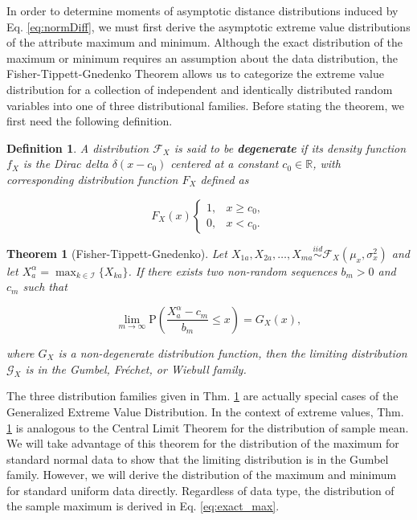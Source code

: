 \documentclass[10pt,letterpaper]{article}\usepackage[]{graphicx}\usepackage[]{color}
\newtheorem{theorem}{Theorem}[section]
\newtheorem{definition}{Definition}[section]
\begin{document}
In order to determine moments of asymptotic distance distributions induced by Eq. \ref{eq:normDiff}, we must first derive the asymptotic extreme value distributions of the attribute maximum and minimum. Although the exact distribution of the maximum or minimum requires an assumption about the data distribution, the Fisher-Tippett-Gnedenko Theorem allows us to categorize the extreme value distribution for a collection of independent and identically distributed random variables into one of three distributional families. Before stating the theorem, we first need the following definition.

\begin{definition}
A distribution $\mathcal{F}_X$ is said to be \textbf{degenerate} if its density function $f_X$ is the Dirac delta $\delta(x - c_0)$ centered at a constant $c_0 \in \mathbb{R}$, with corresponding distribution function $F_X$ defined as

\[F_X(x)\begin{cases}
          1, & x \geq c_0, \\
          0, & x < c_0.
        \end{cases}
\]
\end{definition}

\begin{theorem}[Fisher-Tippett-Gnedenko]\label{thm:EVT}
Let $X_{1a},X_{2a},\dots,X_{ma} \overset{iid}{\sim} \mathcal{F}_X\left(\mu_x,\sigma^2_x\right)$ and let $X^\alpha_a = \displaystyle \max_{k \in \mathcal{I}}\{X_{ka}\}$. If there exists two non-random sequences $b_m>0$ and $c_m$ such that

\[\lim_{m \to \infty} \text{P}\left(\frac{X^\alpha_a - c_m}{b_m} \leq x\right) = G_X(x),\]

\noindent where $G_X$ is a non-degenerate distribution function, then the limiting distribution $\mathcal{G}_X$ is in the Gumbel, Fr\'{e}chet, or Wiebull family.
\end{theorem}

The three distribution families given in Thm. \ref{thm:EVT} are actually special cases of the Generalized Extreme Value Distribution. In the context of extreme values, Thm. \ref{thm:EVT} is analogous to the Central Limit Theorem for the distribution of sample mean. We will take advantage of this theorem for the distribution of the maximum for standard normal data to show that the limiting distribution is in the Gumbel family. However, we will derive the distribution of the maximum and minimum for standard uniform data directly. Regardless of data type, the distribution of the sample maximum is derived in Eq. \ref{eq:exact_max}.
\end{document}
